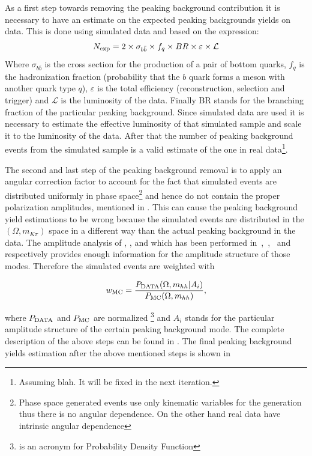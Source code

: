 As a first step towards removing the peaking background contribution it is necessary to have an estimate on the expected
peaking backgrounds yields on data. This is done using simulated data and based on the expression:
\begin{equation}
N_{\rm exp} = 2 \times \sigma_{b\bar{b}}\times f_q \times BR \times \varepsilon \times {\mathcal{L}}
\end{equation}
\noindent Where $\sigma_{b\bar{b}}$ is the cross section for the production of a pair of bottom quarks, $f_q$ is the hadronization fraction
(probability that the $b$ quark forms a meson with another quark type $q$), $\varepsilon$ is the total efficiency (reconstruction, selection and trigger)
and ${\mathcal{L}}$ is the luminosity of the data. Finally BR stands for the branching fraction of the particular peaking background. Since simulated data are used
it is necessary to estimate the effective luminosity of that simulated sample and scale it to the luminosity of the data. After that the number of
peaking background events from the simulated sample is a valid estimate of the one in real 
data\footnote{Assuming blah. {\color{red} It will be fixed in the next iteration.}}.

The second and last step of the peaking background removal is to apply an angular correction factor to account for the fact that 
simulated events are distributed uniformly in phase 
space\footnote{Phase space generated events use only kinematic variables for the generation
thus there is no angular dependence. On the other hand real data have intrinsic angular dependence} 
and hence do not contain the proper polarization amplitudes, mentioned in .
This can cause the peaking background yield estimations to be wrong because the simulated events are distributed in the $(\Omega, m_{K\pi})$ space
in a different way than the actual peaking background in the data. The amplitude analysis of \BdJpsipipi, \BsJpsipipi, \BsJpsiKK and \LbJpsipK 
which has been performed in~\cite{SheldonBdpipi},~\cite{SheldonBspipi},~\cite{SheldonKK} and~\cite{Gao:1701984} respectively provides enough information
for the amplitude structure of those modes. Therefore the simulated events are weighted with

\begin{equation}
w_{\rm MC} = \frac{P_{\rm DATA} (\Omega, m_{hh}  | {A_i})}{P_{\rm MC}(\Omega, m_{hh})},
\end{equation}

\noindent where $P_{\rm DATA}$ and $P_{\rm MC}$ are normalized \pdfs\footnote{\pdf is an acronym for Probability Density Function} and $A_i$ stands for
the particular amplitude structure of the certain peaking background mode. The complete description of the above steps can be found in \cite{BsJpsiKst_ANA}.
The final peaking background yields estimation after the above mentioned steps is shown in 

